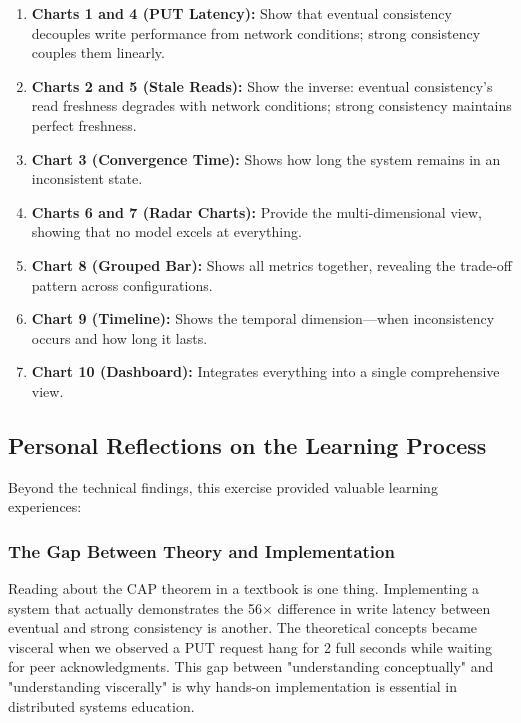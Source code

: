 \documentclass[10pt,a4paper]{article}
\begin{document}
\begin{enumerate}
    \item \textbf{Charts 1 and 4 (PUT Latency):} Show that eventual consistency decouples write performance from network conditions; strong consistency couples them linearly.
    
    \item \textbf{Charts 2 and 5 (Stale Reads):} Show the inverse: eventual consistency's read freshness degrades with network conditions; strong consistency maintains perfect freshness.
    
    \item \textbf{Chart 3 (Convergence Time):} Shows how long the system remains in an inconsistent state.
    
    \item \textbf{Charts 6 and 7 (Radar Charts):} Provide the multi-dimensional view, showing that no model excels at everything.
    
    \item \textbf{Chart 8 (Grouped Bar):} Shows all metrics together, revealing the trade-off pattern across configurations.
    
    \item \textbf{Chart 9 (Timeline):} Shows the temporal dimension---when inconsistency occurs and how long it lasts.
    
    \item \textbf{Chart 10 (Dashboard):} Integrates everything into a single comprehensive view.
\end{enumerate}
\subsection{Personal Reflections on the Learning Process}

Beyond the technical findings, this exercise provided valuable learning experiences:

\subsubsection{The Gap Between Theory and Implementation}

Reading about the CAP theorem in a textbook is one thing. Implementing a system that actually demonstrates the 56× difference in write latency between eventual and strong consistency is another. The theoretical concepts became visceral when we observed a PUT request hang for 2 full seconds while waiting for peer acknowledgments. This gap between "understanding conceptually" and "understanding viscerally" is why hands-on implementation is essential in distributed systems education.
\end{document}
